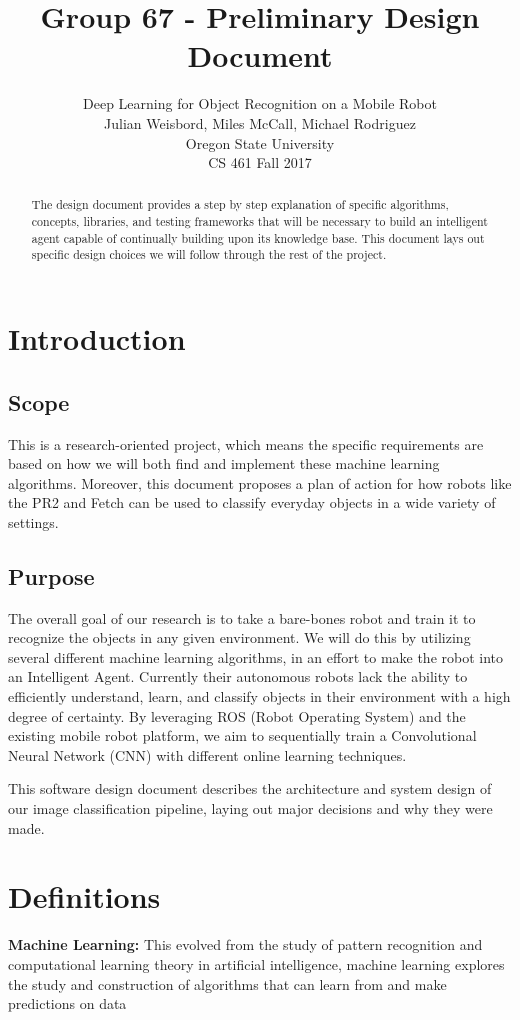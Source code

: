 \documentclass[draftclsnofoot, onecolumn, 10pt, compsoc]{IEEEtran}
\title{Group 67 - Preliminary Design Document}
\author{
	Deep Learning for Object Recognition on a Mobile Robot \\
	Julian Weisbord, Miles McCall, Michael Rodriguez \\
	Oregon State University \\
	CS 461 Fall 2017
}
\begin{document}
	\maketitle

	\begin{abstract}
		\noindent The design document provides a step by step explanation of specific algorithms, concepts, libraries, and testing frameworks that will be necessary to build an intelligent agent capable of continually building upon its knowledge base. This document lays out specific design choices we will follow through the rest of the project.
	\end{abstract}
	\newpage

	\tableofcontents
	\newpage

	\section{Introduction}
		\subsection{Scope}
			This is a research-oriented project, which means the specific requirements are based on how we will both find and implement these machine learning algorithms. Moreover, this document proposes a plan of action for how robots like the PR2 and Fetch can be used to classify everyday objects in a wide variety of settings.

		\subsection{Purpose}
		The overall goal of our research is to take a bare-bones robot and train it to recognize the objects in any given environment. We will do this by utilizing several different machine learning algorithms, in an effort to make the robot into an Intelligent Agent. Currently their autonomous robots lack the ability to efficiently understand, learn, and classify objects in their environment with a high degree of certainty. By leveraging ROS (Robot Operating System) and the existing mobile robot platform, we aim to sequentially train a Convolutional Neural Network (CNN) with different online learning techniques.

		This software design document describes the architecture and system design of our image classification pipeline, laying out major decisions and why they were made.

	\section{Definitions}
		\textbf{Machine Learning:} This evolved from the study of pattern recognition and computational learning theory in artificial intelligence, machine learning explores the study and construction of algorithms that can learn from and make predictions on data \cite{neuralnets}
\end{document}
